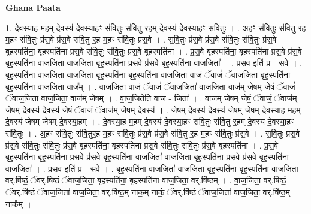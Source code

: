 \documentclass[17pt]{extarticle}
\begin{document}
\textbf{Ghana Paata } \newline

1. दे॒वस्या॒ह म॒हम् दे॒वस्य॑ दे॒वस्या॒हꣳ स॑वि॒तुः स॑वि॒तु र॒हम् दे॒वस्य॑ दे॒वस्या॒हꣳ स॑वि॒तुः । . अ॒हꣳ स॑वि॒तुः स॑वि॒तु र॒ह म॒हꣳ स॑वि॒तुः प्र॑स॒वे प्र॑स॒वे स॑वि॒तु र॒ह म॒हꣳ स॑वि॒तुः प्र॑स॒वे । . स॒वि॒तुः प्र॑स॒वे प्र॑स॒वे स॑वि॒तुः स॑वि॒तुः प्र॑स॒वे बृह॒स्पति॑ना॒ बृह॒स्पति॑ना प्रस॒वे स॑वि॒तुः स॑वि॒तुः प्र॑स॒वे बृह॒स्पति॑ना । . प्र॒स॒वे बृह॒स्पति॑ना॒ बृह॒स्पति॑ना प्रस॒वे प्र॑स॒वे बृह॒स्पति॑ना वाज॒जिता॑ वाज॒जिता॒ बृह॒स्पति॑ना प्रस॒वे प्र॑स॒वे बृह॒स्पति॑ना वाज॒जिता᳚ । . प्र॒स॒व इति॑ प्र - स॒वे । . बृह॒स्पति॑ना वाज॒जिता॑ वाज॒जिता॒ बृह॒स्पति॑ना॒ बृह॒स्पति॑ना वाज॒जिता॒ वाजं॒ ॅवाजं॑ ॅवाज॒जिता॒ बृह॒स्पति॑ना॒ बृह॒स्पति॑ना वाज॒जिता॒ वाज᳚म् । . वा॒ज॒जिता॒ वाजं॒ ॅवाजं॑ ॅवाज॒जिता॑ वाज॒जिता॒ वाज॑म् जेषम् जेषं॒ ॅवाजं॑ ॅवाज॒जिता॑ वाज॒जिता॒ वाज॑म् जेषम् । . वा॒ज॒जितेति॑ वाज - जिता᳚ । . वाज॑म् जेषम् जेषं॒ ॅवाजं॒ ॅवाज॑म् जेषम् दे॒वस्य॑ दे॒वस्य॑ जेषं॒ ॅवाजं॒ ॅवाज॑म् जेषम् दे॒वस्य॑ । . जे॒ष॒म् दे॒वस्य॑ दे॒वस्य॑ जेषम् जेषम् दे॒वस्या॒ह म॒हम् दे॒वस्य॑ जेषम् जेषम् दे॒वस्या॒हम् । . दे॒वस्या॒ह म॒हम् दे॒वस्य॑ दे॒वस्या॒हꣳ स॑वि॒तुः स॑वि॒तु र॒हम् दे॒वस्य॑ दे॒वस्या॒हꣳ स॑वि॒तुः । . अ॒हꣳ स॑वि॒तुः स॑वि॒तुर॒ह म॒हꣳ स॑वि॒तुः प्र॑स॒वे प्र॑स॒वे स॑वि॒तु र॒ह म॒हꣳ स॑वि॒तुः प्र॑स॒वे । . स॒वि॒तुः प्र॑स॒वे प्र॑स॒वे स॑वि॒तुः स॑वि॒तुः प्र॑स॒वे बृह॒स्पति॑ना॒ बृह॒स्पति॑ना प्रस॒वे स॑वि॒तुः स॑वि॒तुः प्र॑स॒वे बृह॒स्पति॑ना । . प्र॒स॒वे बृह॒स्पति॑ना॒ बृह॒स्पति॑ना प्रस॒वे प्र॑स॒वे बृह॒स्पति॑ना वाज॒जिता॑ वाज॒जिता॒ बृह॒स्पति॑ना प्रस॒वे प्र॑स॒वे बृह॒स्पति॑ना वाज॒जिता᳚ । . प्र॒स॒व इति॑ प्र - स॒वे । . बृह॒स्पति॑ना वाज॒जिता॑ वाज॒जिता॒ बृह॒स्पति॑ना॒ बृह॒स्पति॑ना वाज॒जिता॒ वर्.षि॑ष्ठं॒ ॅवर्.षि॑ष्ठं ॅवाज॒जिता॒ बृह॒स्पति॑ना॒ बृह॒स्पति॑ना वाज॒जिता॒ वर्.षि॑ष्ठम् । . वा॒ज॒जिता॒ वर्.षि॑ष्ठं॒ ॅवर्.षि॑ष्ठं ॅवाज॒जिता॑ वाज॒जिता॒ वर्.षि॑ष्ठ॒म् नाक॒म् नाकं॒ ॅवर्.षि॑ष्ठं ॅवाज॒जिता॑ वाज॒जिता॒ वर्.षि॑ष्ठ॒म् नाक᳚म् । \newline
\end{document}
